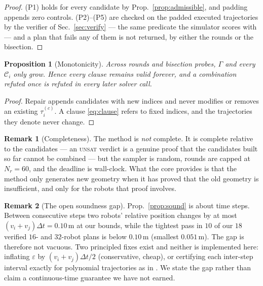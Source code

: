 \documentclass[conference]{IEEEtran}
\theoremstyle{plain}
\newtheorem{proposition}{Proposition}
\theoremstyle{definition}
\newtheorem{remark}{Remark}
\newcommand{\Cand}{\mathcal{C}}
\newcommand{\clr}{\varepsilon}
\begin{document}
\begin{proof}
(P1) holds for every candidate by Prop.~\ref{prop:admissible}, and padding appends zero
controls. (P2)--(P5) are checked on the padded executed trajectories by the verifier of
Sec.~\ref{sec:verify} --- the same predicate the simulator scores with --- and a plan that
fails any of them is not returned, by either the rounds or the bisection.
\end{proof}

\begin{proposition}[Monotonicity]
\label{prop:monotone}
Across rounds and bisection probes, $\Gamma$ and every $\Cand_i$ only grow. Hence every clause
remains valid forever, and a combination refuted once is refuted in every later solver call.
\end{proposition}

\begin{proof}
Repair appends candidates with new indices and never modifies or removes an existing
$\tau_i^{(c)}$. A clause \eqref{eq:clause} refers to fixed indices, and the trajectories they
denote never change.
\end{proof}

\begin{remark}[Completeness]
The method is \emph{not} complete. It is complete relative to the candidates --- an
\textsc{unsat} verdict is a genuine proof that the candidates built so far cannot be combined
--- but the sampler is random, rounds are capped at $N_r = 60$, and the deadline is
wall-clock. What the core provides is that the method only generates new geometry when it has
proved that the old geometry is insufficient, and only for the robots that proof involves.
\end{remark}

\begin{remark}[The open soundness gap]
\label{rem:gap}
Prop.~\ref{prop:sound} is about time steps. Between consecutive steps two robots' relative
position changes by at most $(v_i + v_j)\Delta t = 0.10$\,m at our bounds, while the tightest
pass in $10$ of our $18$ verified $16$- and $32$-robot plans is below $0.10$\,m (smallest
$0.051$\,m). The gap is therefore not vacuous.
Two principled fixes exist and neither is implemented here: inflating $\clr$ by
$(v_i + v_j)\Delta t/2$ (conservative, cheap), or certifying each inter-step interval exactly
for polynomial trajectories as in \cite{parkkim2020}. We state the gap rather than claim a
continuous-time guarantee we have not earned.
\end{remark}
\end{document}

